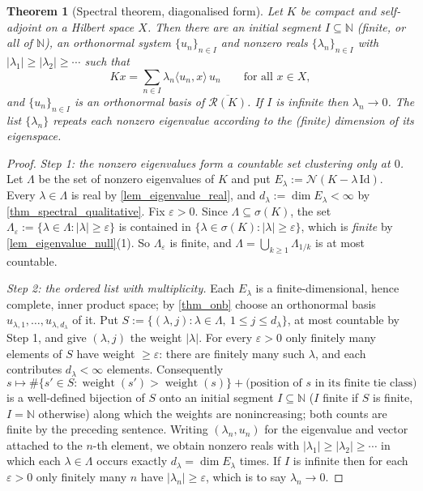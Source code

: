 \documentclass[a4paper]{report}
\theoremstyle{plain}
\newtheorem{theorem}{Theorem}[chapter]
\theoremstyle{definition}
\theoremstyle{remark}
\begin{document}
\begin{theorem}[Spectral theorem, diagonalised form]
  \label{thm_spectral_diagonal}
  Let $K$ be compact and self-adjoint on a Hilbert space $X$.  Then there are an
  \emph{initial segment} $I \subseteq \mathbb{N}$ (finite, or all of $\mathbb{N}$), an
  orthonormal system $\{u_n\}_{n \in I}$ and nonzero reals
  $\{\lambda_n\}_{n \in I}$ with $|\lambda_1| \ge |\lambda_2| \ge \cdots$ such that
  \[
    Kx = \sum_{n \in I} \lambda_n \langle u_n,x\rangle\,u_n \qquad \text{for all } x \in X,
  \]
  and $\{u_n\}_{n\in I}$ is an orthonormal basis of $\overline{\mathcal{R}(K)}$.  If $I$
  is infinite then $\lambda_n \to 0$.  The list $\{\lambda_n\}$ repeats each nonzero
  eigenvalue according to the (finite) dimension of its eigenspace.
\end{theorem}
\begin{proof}
  \emph{Step 1: the nonzero eigenvalues form a countable set clustering only at $0$.}  Let
  $\Lambda$ be the set of nonzero eigenvalues of $K$ and put
  $E_\lambda := \mathcal{N}(K-\lambda\,\mathrm{Id})$.  Every $\lambda \in \Lambda$ is real
  by \cref{lem_eigenvalue_real}, and $d_\lambda := \dim E_\lambda < \infty$ by
  \cref{thm_spectral_qualitative}.  Fix $\varepsilon > 0$.  Since
  $\Lambda \subseteq \sigma(K)$, the set
  $\Lambda_\varepsilon := \{\lambda \in \Lambda : |\lambda| \ge \varepsilon\}$ is contained
  in $\{\lambda \in \sigma(K) : |\lambda| \ge \varepsilon\}$, which is \emph{finite} by
  \cref{lem_eigenvalue_null}(1).  So $\Lambda_\varepsilon$ is finite, and
  $\Lambda = \bigcup_{k\ge1}\Lambda_{1/k}$ is at most countable.

  \emph{Step 2: the ordered list with multiplicity.}  Each $E_\lambda$ is a
  finite-dimensional, hence complete, inner product space; by \cref{thm_onb} choose an
  orthonormal basis $u_{\lambda,1},\dots,u_{\lambda,d_\lambda}$ of it.  Put
  $S := \{(\lambda,j) : \lambda \in \Lambda,\ 1 \le j \le d_\lambda\}$, at most countable by
  Step 1, and give $(\lambda,j)$ the weight $|\lambda|$.  For every $\varepsilon > 0$ only
  finitely many elements of $S$ have weight $\ge \varepsilon$: there are finitely many such
  $\lambda$, and each contributes $d_\lambda < \infty$ elements.  Consequently
  \[
    s \longmapsto \#\{s' \in S : \operatorname{weight}(s') > \operatorname{weight}(s)\}
      + \bigl(\text{position of } s \text{ in its finite tie class}\bigr)
  \]
  is a well-defined bijection of $S$ onto an initial segment $I \subseteq \mathbb{N}$ ($I$
  finite if $S$ is finite, $I = \mathbb{N}$ otherwise) along which the weights are
  nonincreasing; both counts are finite by the preceding sentence.  Writing
  $(\lambda_n,u_n)$ for the eigenvalue and vector attached to the $n$-th element, we obtain
  nonzero reals with $|\lambda_1| \ge |\lambda_2| \ge \cdots$ in which each
  $\lambda \in \Lambda$ occurs exactly $d_\lambda = \dim E_\lambda$ times.  If $I$ is
  infinite then for each $\varepsilon > 0$ only finitely many $n$ have
  $|\lambda_n| \ge \varepsilon$, which is to say $\lambda_n \to 0$.


\end{proof}
\end{document}
